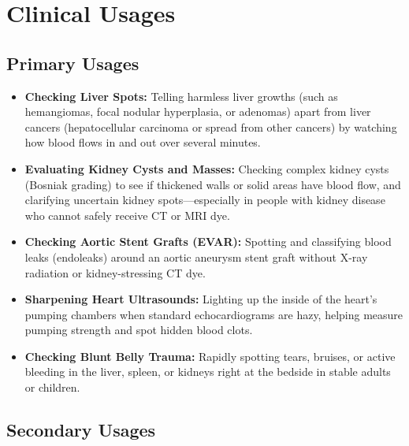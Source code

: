 \section{Clinical Usages}

\subsection{Primary Usages}

\begin{itemize}
    \item \textbf{Checking Liver Spots:} Telling harmless liver growths (such as hemangiomas, focal nodular hyperplasia, or adenomas) apart from liver cancers (hepatocellular carcinoma or spread from other cancers) by watching how blood flows in and out over several minutes.
    \item \textbf{Evaluating Kidney Cysts and Masses:} Checking complex kidney cysts (Bosniak grading) to see if thickened walls or solid areas have blood flow, and clarifying uncertain kidney spots---especially in people with kidney disease who cannot safely receive CT or MRI dye.
    \item \textbf{Checking Aortic Stent Grafts (EVAR):} Spotting and classifying blood leaks (endoleaks) around an aortic aneurysm stent graft without X-ray radiation or kidney-stressing CT dye.
    \item \textbf{Sharpening Heart Ultrasounds:} Lighting up the inside of the heart's pumping chambers when standard echocardiograms are hazy, helping measure pumping strength and spot hidden blood clots.
    \item \textbf{Checking Blunt Belly Trauma:} Rapidly spotting tears, bruises, or active bleeding in the liver, spleen, or kidneys right at the bedside in stable adults or children.
\end{itemize}

\subsection{Secondary Usages}

